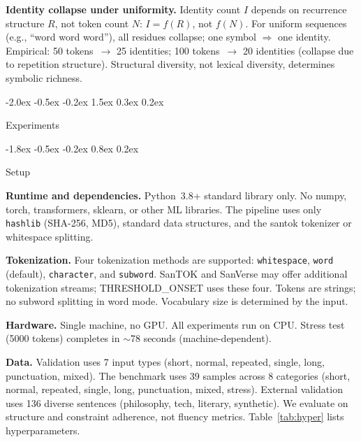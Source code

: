 \documentclass[10pt]{article}
\makeatletter
\renewcommand{\section}{\@startsection{section}{1}{\z@}%
  {-2.0ex \@plus -0.5ex \@minus -0.2ex}%
  {1.5ex \@plus 0.3ex \@minus 0.2ex}%
  {\large\bfseries\raggedright}}
\renewcommand{\subsection}{\@startsection{subsection}{2}{\z@}%
  {-1.8ex \@plus -0.5ex \@minus -0.2ex}%
  {0.8ex \@plus 0.2ex}%
  {\normalsize\bfseries\raggedright}}
\makeatother
\begin{document}
\textbf{Identity collapse under uniformity.}
Identity count $I$ depends on recurrence structure $R$, not token count $N$:
$I = f(R)$, not $f(N)$. For uniform sequences (e.g., ``word word word''), all residues
collapse; one symbol $\Rightarrow$ one identity. Empirical: 50 tokens~$\rightarrow$
25 identities; 100 tokens~$\rightarrow$ 20 identities (collapse due to repetition
structure). Structural diversity, not lexical diversity, determines symbolic richness.

\section{Experiments}
\label{sec:exp}

\subsection{Setup}

\textbf{Runtime and dependencies.}
Python~3.8+ standard library only. No numpy, torch, transformers, sklearn, or other
ML libraries. The pipeline uses only \texttt{hashlib} (SHA-256, MD5), standard data
structures, and the santok tokenizer or whitespace splitting.

\textbf{Tokenization.}
Four tokenization methods are supported: \texttt{whitespace}, \texttt{word}
(default), \texttt{character}, and \texttt{subword}. SanTOK and SanVerse may offer
additional tokenization streams; THRESHOLD\_ONSET uses these four.
Tokens are strings; no subword splitting in word mode. Vocabulary size is determined
by the input.

\textbf{Hardware.}
Single machine, no GPU. All experiments run on CPU. Stress test (5000 tokens) completes
in $\sim$78 seconds (machine-dependent).

\textbf{Data.}
Validation uses 7 input types (short, normal, repeated, single, long, punctuation,
mixed). The benchmark uses 39 samples across 8 categories (short, normal, repeated,
single, long, punctuation, mixed, stress). External validation uses 136 diverse
sentences (philosophy, tech, literary, synthetic). We evaluate on structure and
constraint adherence, not fluency metrics. Table~\ref{tab:hyper} lists hyperparameters.
\end{document}
